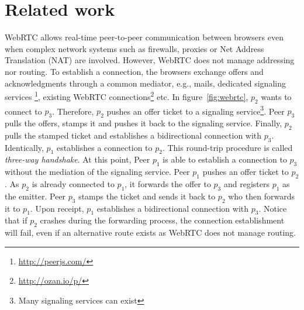 
\begin{figure*}
\centering
{}
\hspace{5pt}
\hspace{5pt}
\caption{\label{fig:webrtc}Creating an overlay network on top of WebRTC.}
\end{figure*}


\section{Related work}
\label{sec:relatedwork}


WebRTC allows real-time peer-to-peer communication between browsers even when 
complex network systems such as firewalls, proxies or Net Address Translation
(NAT) are involved. However, WebRTC does not manage addressing nor routing. To
establish a connection, the browsers exchange offers and acknowledgments
through a common mediator, e.g., mails, dedicated signaling services
\footnote{\url{http://peerjs.com/}},
existing WebRTC connections\footnote{\url{http://ozan.io/p/}} etc. In
figure~\ref{fig:webrtc}, $p_2$ wants to connect to $p_3$. Therefore, $p_2$
pushes an offer ticket to a signaling service\footnote{Many signaling services
  can exist}. Peer $p_3$ pulls the offers, stamps it and pushes it back to the
signaling service. Finally, $p_2$ pulls the stamped ticket and establishes a
bidirectional connection with $p_3$.  Identically, $p_1$ establishes a
connection to $p_2$. This round-trip procedure is called \emph{three-way
  handshake}. At this point, Peer $p_1$ is able to establish a connection to
$p_3$ without the mediation of the signaling service. Peer $p_1$ pushes an
offer ticket to $p_2$.  As $p_2$ is already connected to $p_1$, it forwards the
offer to $p_3$ and registers $p_1$ as the emitter. Peer $p_3$ stamps the ticket
and sends it back to $p_2$ who then forwards it to $p_1$. Upon receipt, $p_1$
establishes a bidirectional connection with $p_3$. Notice that if $p_2$
crashes during the forwarding process, the connection establishment will fail,
even if an alternative route exists as WebRTC does not manage routing.

